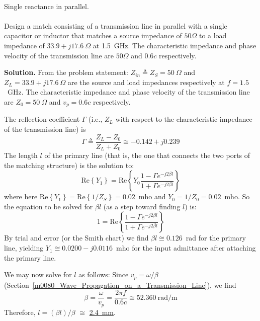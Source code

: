 ~\\ \begin{example} 
\label{m0093_eSSR-P}
\begin{mdframed}[backgroundcolor=brown!20,linecolor=brown!20]\raggedright
Single reactance in parallel.
\\~\\
Design a match consisting of a transmission line in parallel with a single capacitor or inductor that matches a source impedance of $50\Omega$ to a load impedance of $33.9 + j17.6~\Omega$ at 1.5~GHz. 
The characteristic impedance and phase velocity of the transmission line are $50\Omega$ and $0.6c$ respectively.

{\bf Solution.}
From the problem statement: 
$Z_{in} \triangleq Z_S = 50~\Omega$ and 
$Z_L = 33.9+j17.6~\Omega$ are the source and load impedances respectively at $f=1.5$~GHz.
The characteristic impedance and phase velocity of the transmission line are $Z_0=50~\Omega$ and $v_p=0.6c$ respectively. 

The reflection coefficient $\Gamma$ (i.e., $Z_L$ with respect to the characteristic impedance of the transmission line) is
%
\begin{equation}
\Gamma \triangleq \frac{Z_L - Z_0}{Z_L + Z_0} \cong -0.142 + j0.239
\end{equation} 
%
The length $l$ of the primary line (that is, the one that connects the two ports of the matching structure) is the solution to:
%
\begin{equation}
\mbox{Re}\left\{Y_1\right\} = \mbox{Re}\left\{Y_{0} \frac{ 1 - \Gamma e^{-j2\beta l} }{ 1 + \Gamma e^{-j2\beta l} }\right\}
\end{equation}
% 
where here
$\mbox{Re}\left\{Y_1\right\}=\mbox{Re}\left\{1/Z_S\right\}=0.02$~mho and 
$Y_0 = 1/Z_0 = 0.02$~mho.
So the equation to be solved for $\beta l$ (as a step toward finding $l$) is:
%
\begin{equation}
1 = \mbox{Re}\left\{ 
           \frac{ 1-\Gamma e^{-j2\beta l } }
                { 1+\Gamma e^{-j2\beta l } } \right\} 
\end{equation}
%
By trial and error (or the Smith chart) we find $\beta l\cong 0.126$~rad for the primary line, yielding $Y_1 \cong 0.0200-j0.0116$~mho for the input admittance after attaching the primary line.  

We may now solve for $l$ as follows:
Since $v_p = \omega/\beta$ (Section~\ref{m0080_Wave_Propagation_on_a_Transmission_Line}), we find
%
\begin{equation}
\beta = \frac{\omega}{v_p} = \frac{2\pi f}{0.6 c} \cong 52.360~\mbox{rad/m} 
\end{equation}
%
Therefore, $l=\left(\beta l\right)/\beta$ $\cong$ \underline{2.4~mm}.


\end{mdframed}
\end{example}
